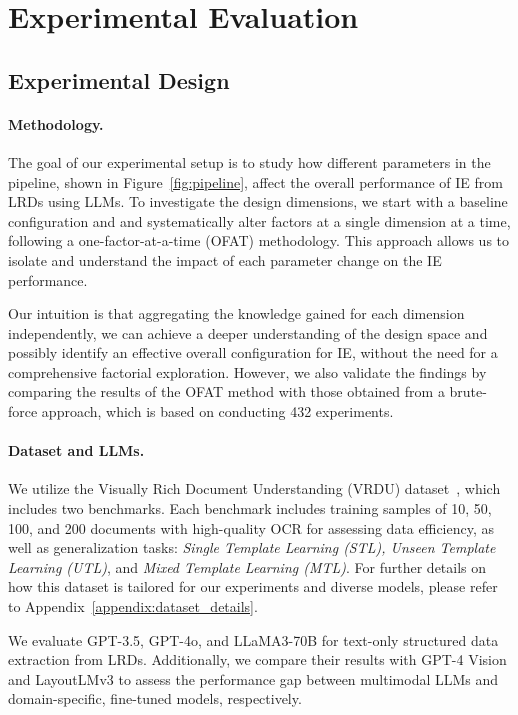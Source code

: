 \section{Experimental Evaluation}
\label{sec:experimental_evaluation}

\subsection{Experimental Design}
\paragraph{Methodology.} The goal of our experimental setup is to study how different parameters in the pipeline, shown in Figure~\ref{fig:pipeline}, affect the overall performance of IE from LRDs using LLMs. To investigate the design dimensions, we start with a baseline configuration and and systematically alter factors at a single dimension at a time, following a one-factor-at-a-time (OFAT) methodology. This approach allows us to isolate and understand the impact of each parameter change on the IE performance.

Our intuition is that aggregating the knowledge gained for each dimension independently, we can achieve a deeper understanding of the design space and possibly identify an effective overall configuration for IE, without the need for a comprehensive factorial exploration. However, we also validate the findings by comparing the results of the OFAT method with those obtained from a brute-force approach, which is based on conducting 432 experiments.

\paragraph{Dataset and LLMs.}
We utilize the Visually Rich Document Understanding (VRDU) dataset~\cite{wang2023vrdu}, which includes two benchmarks. Each benchmark includes training samples of 10, 50, 100, and 200 documents with high-quality OCR for assessing data efficiency, as well as generalization tasks: \textit{Single Template Learning (STL), Unseen Template Learning (UTL)}, and \textit{Mixed Template Learning (MTL)}. For further details on how this dataset is tailored for our experiments and diverse models, please refer to Appendix~\ref{appendix:dataset_details}.

We evaluate GPT-3.5, GPT-4o, and LLaMA3-70B for text-only structured data extraction from LRDs.
Additionally, we compare their results with GPT-4 Vision and LayoutLMv3 to assess the performance gap between multimodal LLMs and domain-specific, fine-tuned models, respectively.


